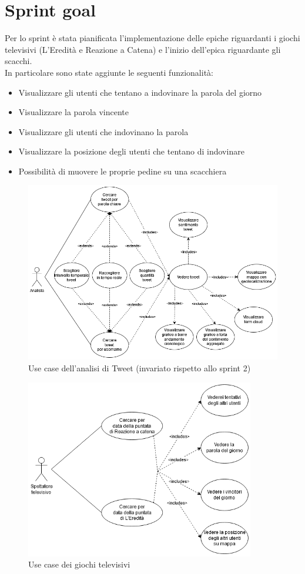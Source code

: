 \documentclass[11pt]{article}
\begin{document}
\section*{Sprint goal}
\justify
Per lo sprint è stata pianificata l'implementazione delle epiche riguardanti i giochi televisivi (L'Eredità e Reazione a Catena) e
l'inizio dell'epica riguardante gli scacchi.\\
In particolare sono state aggiunte le seguenti funzionalità:
\begin{itemize}
    \item Visualizzare gli utenti che tentano a indovinare la parola del giorno
    \item Visualizzare la parola vincente
    \item Visualizzare gli utenti che indovinano la parola
    \item Visualizzare la posizione degli utenti che tentano di indovinare
    \item Possibilità di muovere le proprie pedine su una scacchiera
\end{itemize}


\begin{figure}[H]
    \centering
    \includegraphics[width=12cm]{./img/tweet_usecase.png}
    \caption{Use case dell'analisi di Tweet (invariato rispetto allo sprint 2)}
\end{figure}

\begin{figure}[H]
    \centering
    \includegraphics[width=10cm]{./img/tvgames_usecase.png}
    \caption{Use case dei giochi televisivi}
\end{figure}
\end{document}
